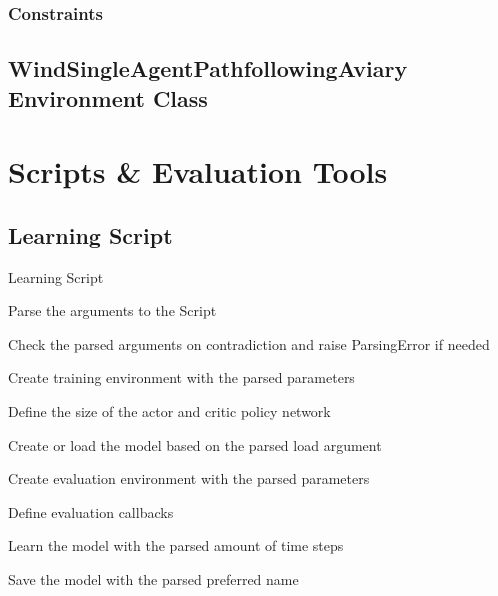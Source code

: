 \newpage

\subsubsection{Constraints}

\newpage

\subsection{WindSingleAgentPathfollowingAviary Environment Class}


\newpage

\section{Scripts \& Evaluation Tools} \label{sec:scripts}



\subsection{Learning Script}
\begin{algorithm}
	\caption{Learning Script}
	\label{alg:learn}
	 Parse the arguments to the Script
	 
	 Check the parsed arguments on contradiction and raise ParsingError if needed
	 
	 Create training environment with the parsed parameters
	 
	 Define the size of the actor and critic policy network
	 
	 Create or load the model based on the parsed load argument
	 
	 Create evaluation environment with the parsed parameters
	 
	 Define evaluation callbacks
	 
	 Learn the model with the parsed amount of time steps
	 
	 Save the model with the parsed preferred name
	 
	 
\end{algorithm}

\newpage

